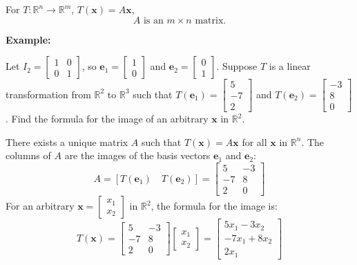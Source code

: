 \documentclass[../linear-algebra.tex]{subfiles}
\begin{document}
\noindent For $T:\mathbb{R}^n\rightarrow\mathbb{R}^m$, $T(\mathbf{x})=A\mathbf{x}$,
\[A \text{ is an } m\times n \text{ matrix.}\]

\bigskip
\noindent
\begin{minipage}{\textwidth}
\textbf{Example:}

\noindent Let $I_2 = \begin{bmatrix} 1 & 0 \\ 0 & 1 \end{bmatrix}$, 
so $\mathbf{e}_1 = \begin{bmatrix} 1 \\ 0 \end{bmatrix}$ and $\mathbf{e}_2 = \begin{bmatrix} 0 \\ 1 \end{bmatrix}$. 
Suppose $T$ is a linear transformation from $\mathbb{R}^2$ to $\mathbb{R}^3$ 
such that $T(\mathbf{e}_1) = \begin{bmatrix} 5 \\ -7 \\ 2 \end{bmatrix}$ and $T(\mathbf{e}_2) = \begin{bmatrix} -3 \\ 8 \\ 0 \end{bmatrix}$. 
Find the formula for the image of an arbitrary $\mathbf{x}$ in $\mathbb{R}^2$.

\vspace{1em}

\noindent There exists a unique matrix $A$ such that $T(\mathbf{x}) = A\mathbf{x}$ for all $\mathbf{x}$ in $\mathbb{R}^n$. 
The columns of $A$ are the images of the basis vectors $\mathbf{e}_1$ and $\mathbf{e}_2$:
\[
A = [T(\mathbf{e}_1) \quad T(\mathbf{e}_2)] = \begin{bmatrix} 5 & -3 \\ -7 & 8 \\ 2 & 0 \end{bmatrix}
\]
For an arbitrary $\mathbf{x} = \begin{bmatrix} x_1 \\ x_2 \end{bmatrix}$ in $\mathbb{R}^2$, the formula for the image is:
\[
T(\mathbf{x}) = \begin{bmatrix} 5 & -3 \\ -7 & 8 \\ 2 & 0 \end{bmatrix} \begin{bmatrix} x_1 \\ x_2 \end{bmatrix} = \begin{bmatrix} 5x_1 - 3x_2 \\ -7x_1 + 8x_2 \\ 2x_1 \end{bmatrix}
\]
\end{minipage}
\end{document}
